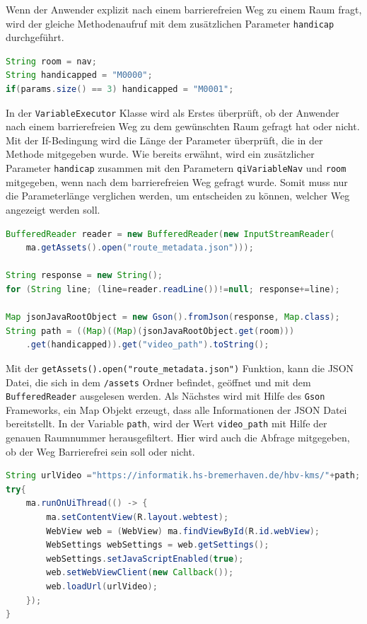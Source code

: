 Wenn der Anwender explizit nach einem barrierefreien Weg zu einem Raum fragt, wird der gleiche Methodenaufruf mit dem zusätzlichen Parameter \verb|handicap| durchgeführt.\\

\begin{lstlisting}[language=Java]
String room = nav;
String handicapped = "M0000";
if(params.size() == 3) handicapped = "M0001";
\end{lstlisting}


In der \verb|VariableExecutor| Klasse wird als Erstes überprüft, ob der Anwender nach einem barrierefreien Weg zu dem gewünschten Raum gefragt hat oder nicht. Mit der If-Bedingung wird die Länge der Parameter überprüft, die in der Methode mitgegeben wurde. Wie bereits erwähnt, wird ein zusätzlicher Parameter \verb|handicap| zusammen mit den Parametern \verb|qiVariableNav| und \verb|room| mitgegeben, wenn nach dem barrierefreien Weg gefragt wurde. Somit muss nur die Parameterlänge verglichen werden, um entscheiden zu können, welcher Weg angezeigt werden soll.\\

\begin{lstlisting}[language=Java]
BufferedReader reader = new BufferedReader(new InputStreamReader(
    ma.getAssets().open("route_metadata.json")));

String response = new String();
for (String line; (line=reader.readLine())!=null; response+=line);

Map jsonJavaRootObject = new Gson().fromJson(response, Map.class);
String path = ((Map)((Map)(jsonJavaRootObject.get(room)))
    .get(handicapped)).get("video_path").toString();
\end{lstlisting}

Mit der \verb|getAssets().open("route_metadata.json")| Funktion, kann die JSON Datei, die sich in dem \verb|/assets| Ordner befindet, geöffnet und mit dem \verb|BufferedReader| ausgelesen werden. Als Nächstes wird mit Hilfe des \verb|Gson| Frameworks, ein Map Objekt erzeugt, dass alle Informationen der JSON Datei bereitstellt. In der Variable \verb|path|, wird der Wert 
\verb|video_path| mit Hilfe der genauen Raumnummer herausgefiltert. Hier wird auch die Abfrage mitgegeben, ob der Weg Barrierefrei sein soll oder nicht.\\


\begin{lstlisting}[language=Java]
String urlVideo ="https://informatik.hs-bremerhaven.de/hbv-kms/"+path;
try{
    ma.runOnUiThread(() -> {
        ma.setContentView(R.layout.webtest);
        WebView web = (WebView) ma.findViewById(R.id.webView);
        WebSettings webSettings = web.getSettings();
        webSettings.setJavaScriptEnabled(true);
        web.setWebViewClient(new Callback());
        web.loadUrl(urlVideo);
    });
}
\end{lstlisting}

